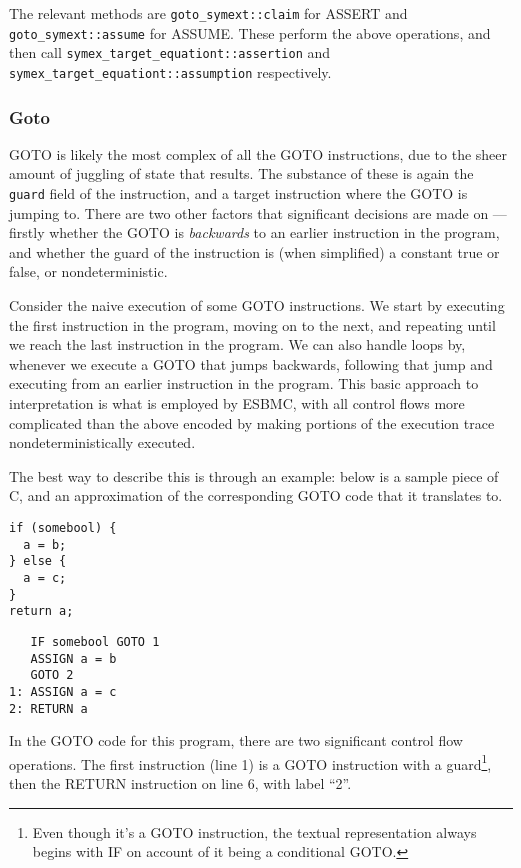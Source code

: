 \documentclass{article}
\begin{document}
The relevant methods are \texttt{goto\_symext::claim} for ASSERT and
\texttt{goto\_symext::assume} for ASSUME. These perform the above operations,
and then call \texttt{symex\_target\_equationt::assertion} and
\texttt{symex\_target\_equationt::assumption} respectively.

\subsubsection{Goto}

GOTO is likely the most complex of all the GOTO instructions, due to the sheer
amount of juggling of state that results. The substance of these is again
the \texttt{guard} field of the instruction, and a target instruction where the
GOTO is jumping to. There are two other factors that significant decisions
are made on --- firstly whether the GOTO is \textit{backwards} to an earlier
instruction in the program, and whether the guard of the instruction is (when
simplified) a constant true or false, or nondeterministic.

Consider the naive execution of some GOTO instructions. We start by executing
the first instruction in the program, moving on to the next, and repeating until
we reach the last instruction in the program. We can also handle loops by,
whenever we execute a GOTO that jumps backwards, following that jump and
executing from an earlier instruction in the program. This basic approach to
interpretation is what is employed by ESBMC, with all control flows more
complicated than the above encoded by making portions of the execution trace
nondeterministically executed.

The best way to describe this is through an example: below is a sample piece
of C, and an approximation of the corresponding GOTO code that it translates to.

\begin{lstlisting}
if (somebool) {
  a = b;
} else {
  a = c;
}
return a;
\end{lstlisting}

\begin{lstlisting}
   IF somebool GOTO 1
   ASSIGN a = b
   GOTO 2
1: ASSIGN a = c
2: RETURN a
\end{lstlisting}

In the GOTO code for this program, there are two significant control flow
operations. The first instruction (line 1) is a GOTO instruction with a
guard\footnote{Even though it's a GOTO instruction, the textual representation
always begins with IF on account of it being a conditional GOTO.}, then the
RETURN instruction on line 6, with label ``2''.
\end{document}

